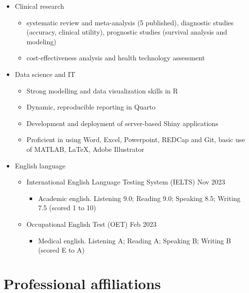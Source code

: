 \documentclass[
  11pt,
]
{article}
\providecommand{\tightlist}{%
  \setlength{\itemsep}{0pt}\setlength{\parskip}{0pt}}
\begin{document}
\begin{itemize}
\tightlist
\item
  Clinical research

  \begin{itemize}
  \tightlist
  \item
    systematic review and meta-analysis (5 published), diagnostic
    studies (accuracy, clinical utility), prognostic studies (survival
    analysis and modeling)
  \item
    cost-effectiveness analysis and health technology assessment
  \end{itemize}
\item
  Data science and IT

  \begin{itemize}
  \tightlist
  \item
    Strong modelling and data visualization skills in R
  \item
    Dynamic, reproducible reporting in Quarto
  \item
    Development and deployment of server-based Shiny applications
  \item
    Proficient in using Word, Excel, Powerpoint, REDCap and Git, basic
    use of MATLAB, LaTeX, Adobe Illustrator
  \end{itemize}
\item
  English language

  \begin{itemize}
  \tightlist
  \item
    International English Language Testing System (IELTS) \hfill Nov
    2023

    \begin{itemize}
    \tightlist
    \item
      Academic english. Listening 9.0; Reading 9.0; Speaking 8.5;
      Writing 7.5 (scored 1 to 10)
    \end{itemize}
  \item
    Occupational English Test (OET) \hfill Feb 2023

    \begin{itemize}
    \tightlist
    \item
      Medical english. Listening A; Reading A; Speaking B; Writing B
      (scored E to A)
    \end{itemize}
  \end{itemize}
\end{itemize}

\section{Professional affiliations}\label{professional-affiliations}
\end{document}
